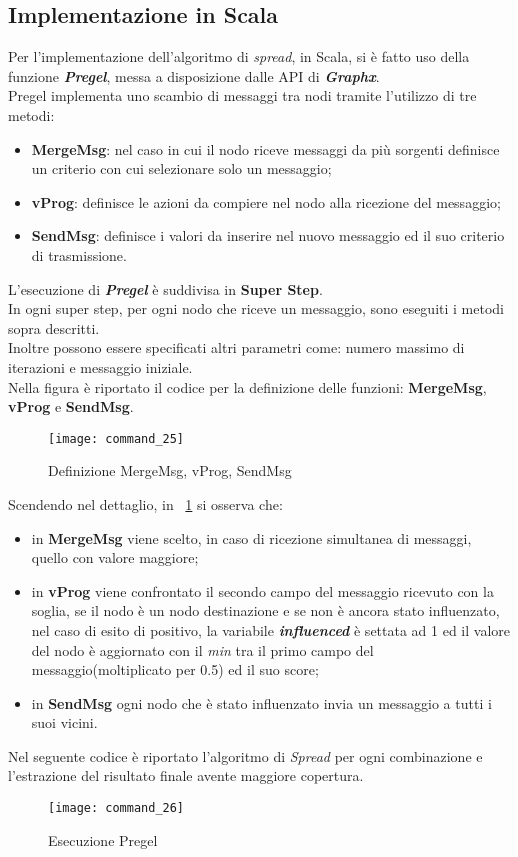 \subsection{Implementazione in Scala}
Per l'implementazione dell'algoritmo di \textit{spread}, in Scala, si è fatto uso
della funzione \textit{\textbf{Pregel}}, messa a disposizione dalle API di
\textit{\textbf{Graphx}}.\\
Pregel implementa uno scambio di messaggi tra nodi tramite l'utilizzo di tre
metodi:
\begin{itemize}
	\item \textbf{MergeMsg}: nel caso in cui il nodo riceve messaggi da più sorgenti
	definisce un criterio con cui selezionare solo un messaggio;
	\item \textbf{vProg}: definisce le azioni da compiere nel nodo alla ricezione del messaggio;
	\item \textbf{SendMsg}: definisce i valori da inserire nel nuovo messaggio ed
	il suo criterio di trasmissione.
\end{itemize}
L'esecuzione di \textit{\textbf{Pregel}} è suddivisa in \textbf{Super Step}.\\
In ogni super step, per ogni nodo che riceve un messaggio, sono eseguiti i metodi
sopra descritti.\\
Inoltre possono essere specificati altri parametri come: numero massimo di
iterazioni e messaggio iniziale.\\
Nella figura è riportato il codice per la definizione delle funzioni:
\textbf{MergeMsg}, \textbf{vProg} e \textbf{SendMsg}.
\begin{figure}[!htbp]
  \texttt{[image: command\_25]}
  \caption{Definizione MergeMsg, vProg, SendMsg}
  \label{command_25}
\end{figure}
\clearpage
Scendendo nel dettaglio, in \figurename~\ref{command_25} si osserva che:
\begin{itemize}
	\item in \textbf{MergeMsg} viene scelto, in caso di ricezione simultanea di
	messaggi, quello con valore maggiore;
	\item in \textbf{vProg} viene confrontato il secondo campo del messaggio ricevuto
	con la soglia, se il nodo è un nodo destinazione e se non è ancora
	stato influenzato, nel caso di esito di positivo, la variabile
	\textit{\textbf{influenced}} è settata ad 1 ed il valore del nodo è aggiornato
	con il \textit{min} tra il primo campo del messaggio(moltiplicato per 0.5) ed il suo score;
	\item in \textbf{SendMsg} ogni nodo che è stato influenzato invia un messaggio
	a tutti i suoi vicini.
\end{itemize}
Nel seguente codice è riportato l'algoritmo di \textit{Spread} per ogni
combinazione e l'estrazione del risultato finale avente maggiore copertura.
\begin{figure}[!htbp]
  \texttt{[image: command\_26]}
  \caption{Esecuzione Pregel}
  \label{command_26}
\end{figure}
\clearpage
